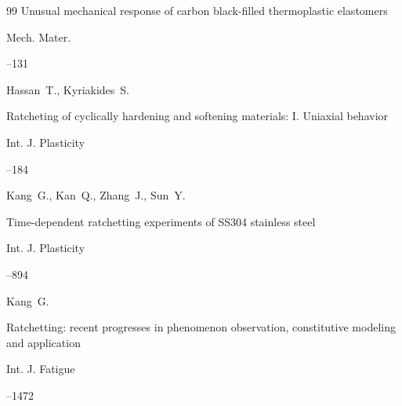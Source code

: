 \begin{thebibliography}{99}
\paper Unusual mechanical response of carbon black-filled thermoplastic elastomers

\jour Mech. Mater.




--131







\by Hassan~T., Kyriakides~S.

\paper Ratcheting of cyclically hardening and softening materials: I. Uniaxial behavior 

\jour Int. J. Plasticity




--184







\by Kang~G., Kan~Q., Zhang~J., Sun~Y.

\paper Time-dependent ratchetting experiments of SS304 stainless steel

\jour Int. J. Plasticity




--894







\by Kang~G.

\paper Ratchetting: recent progresses in phenomenon observation, constitutive modeling and application

\jour Int. J. Fatigue




--1472







\end{thebibliography}

